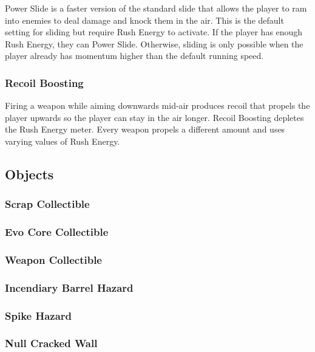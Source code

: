 \documentclass[12pt]{article}
\begin{document}
Power Slide is a faster version of the standard slide that allows the player to ram into enemies to deal damage and knock them in the air. This is the default setting for sliding but require Rush Energy to activate. If the player has enough Rush Energy, they can Power Slide. Otherwise, sliding is only possible when the player already has momentum higher than the default running speed. 

\subsubsection{Recoil Boosting}

Firing a weapon while aiming downwards mid-air produces recoil that propels the player upwards so the player can stay in the air longer. Recoil Boosting depletes the Rush Energy meter. Every weapon propels a different amount and uses varying values of Rush Energy. 

\subsection{Objects}

\subsubsection{Scrap Collectible}

\subsubsection{Evo Core Collectible}

\subsubsection{Weapon Collectible}

\subsubsection{Incendiary Barrel Hazard}

\subsubsection{Spike Hazard}

\subsubsection{Null Cracked Wall}
\end{document}
